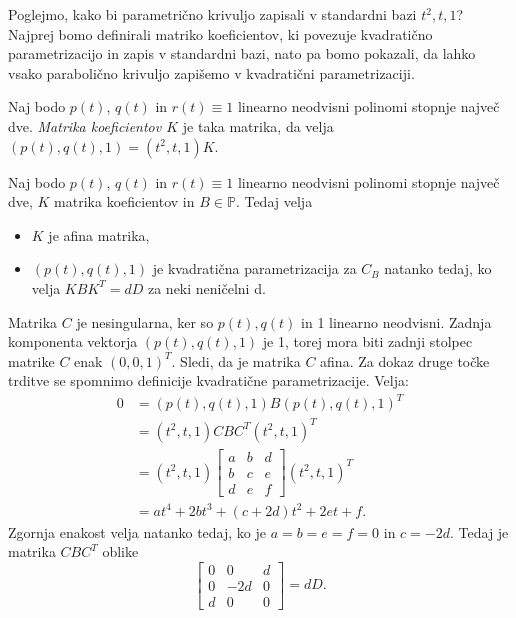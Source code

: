 \documentclass[mat1]{fmfdelo}
\newcommand{\PP}{\mathbb P}
\begin{document}
Poglejmo, kako bi parametrično krivuljo zapisali v standardni bazi $t^2, t, 1$? Najprej bomo definirali matriko koeficientov, ki povezuje kvadratično parametrizacijo in zapis v standardni bazi, nato pa bomo pokazali, da lahko vsako parabolično krivuljo zapišemo v kvadratični parametrizaciji.

\begin{definicija}
Naj bodo $p(t)$, $q(t)$ in $r(t) \equiv 1$ linearno neodvisni polinomi stopnje največ dve. \emph{Matrika koeficientov $K$} je taka matrika, da velja $ (p(t), q(t), 1) = (t^2,t,1) K$.
\end{definicija} 

\begin{trditev}
Naj bodo $p(t)$, $q(t)$ in $r(t) \equiv 1$ linearno neodvisni polinomi stopnje največ dve, $K$ matrika koeficientov in $B \in \PP$. Tedaj velja
\begin{itemize}
\item $K$ je afina matrika,
\item  $ ( p(t), q(t), 1)$ je kvadratična parametrizacija za $C_B$ natanko tedaj, ko velja $K B K^T = d D$ za neki neničelni d.
\end{itemize}
\end{trditev}

\begin{dokaz}
Matrika $C$ je nesingularna, ker so $p(t), q(t)$ in 1 linearno neodvisni. Zadnja komponenta vektorja $(p(t), q(t), 1)$ je 1, torej mora biti zadnji stolpec matrike $C$ enak $(0,0,1)^T$. Sledi, da je matrika $C$ afina. Za dokaz druge točke trditve se spomnimo definicije kvadratične parametrizacije.
Velja:
\begin{align*}
0 &= (p(t), q(t), 1) B (p(t), q(t), 1)^T \\
   &= (t^2, t, 1) C B C^T (t^2, t, 1)^T \\
   &= (t^2, t, 1) 
\begin{bmatrix}
a & b & d \\
b & c & e \\
d & e & f
\end{bmatrix}
(t^2, t, 1)^T \\
   &= a t^4 + 2 b t^3 + (c+2d)t^2 + 2et + f
.\end{align*}
Zgornja enakost velja natanko tedaj, ko je $a=b=e=f=0$ in $c=-2d$. Tedaj je matrika $CBC^T$ oblike
$$
\begin{bmatrix}
0 & 0 & d \\
0 & -2d & 0 \\
d & 0 & 0
\end{bmatrix}
=
dD.
$$
\end{dokaz}
\end{document}
